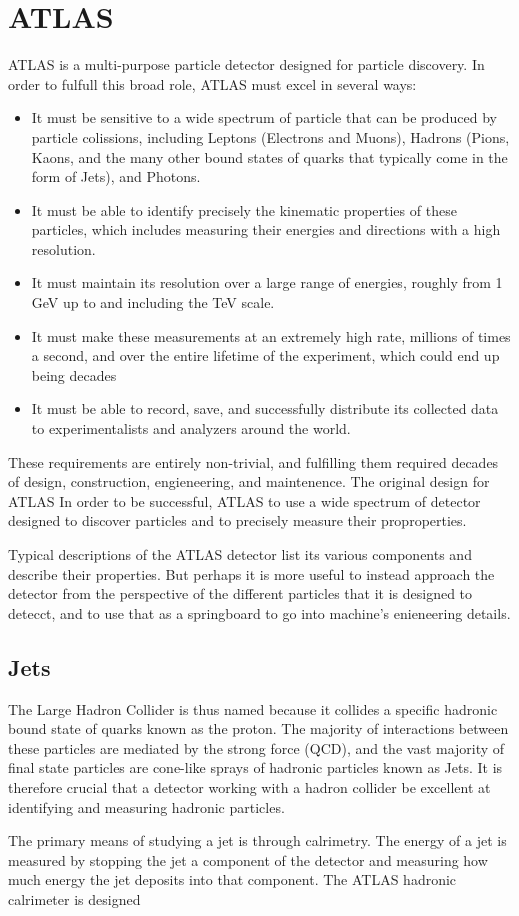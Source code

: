 %
%
%


\section{ATLAS}
ATLAS is a multi-purpose particle detector designed for particle discovery.
In order to fulfull this broad role, ATLAS must excel in several ways:

\begin{itemize}
  \item It must be sensitive to a wide spectrum of particle that can be produced by particle colissions, including Leptons (Electrons and Muons), Hadrons (Pions, Kaons, and the many other bound states of quarks that typically come in the form of Jets), and Photons.
  \item It must be able to identify precisely the kinematic properties of these particles, which includes measuring their energies and directions with a high resolution.
  \item It must maintain its resolution over a large range of energies, roughly from 1 GeV up to and including the TeV scale.
  \item It must make these measurements at an extremely high rate, millions of times a second, and over the entire lifetime of the experiment, which could end up being decades
  \item It must be able to record, save, and successfully distribute its collected data to experimentalists and analyzers around the world.
\end{itemize}

These requirements are entirely non-trivial, and fulfilling them required decades of design, construction, engieneering, and maintenence.  
The original design for ATLAS
In order to be successful, ATLAS 
to use a wide spectrum of detector designed to discover particles and to precisely measure their proproperties.


Typical descriptions of the ATLAS detector list its various components and describe their properties.
But perhaps it is more useful to instead approach the detector from the perspective of the different particles that it is designed to detecct, and to use that as a springboard to go into machine's enieneering details.

\subsection{Jets}

The Large Hadron Collider is thus named because it collides a specific hadronic bound state of quarks known as the proton.
The majority of interactions between these particles are mediated by the strong force (QCD), and the vast majority of final state particles are cone-like sprays of hadronic particles known as Jets.
It is therefore crucial that a detector working with a hadron collider be excellent at identifying and measuring hadronic particles.

The primary means of studying a jet is through calrimetry.
The energy of a jet is measured by stopping the jet a component of the detector and measuring how much energy the jet deposits into that component.
The ATLAS hadronic calrimeter is designed 

